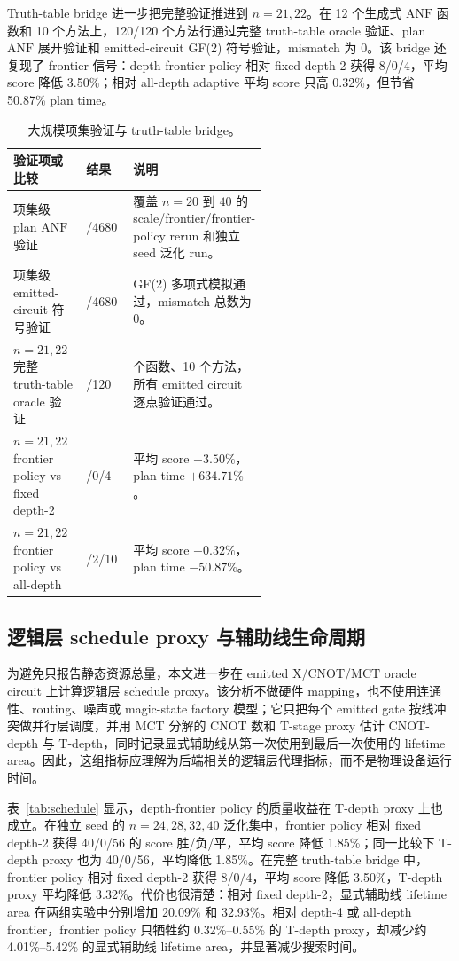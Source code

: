 \documentclass[UTF8,fontset=macnew,11pt]{ctexart}
\newcommand{\anf}{\ensuremath{\mathrm{ANF}}}
\newcommand{\ttable}{truth-table}
\newcommand{\mct}{\ensuremath{\mathrm{MCT}}}
\begin{document}
Truth-table bridge 进一步把完整验证推进到 $n=21,22$。在 12 个生成式 \anf{} 函数和 10 个方法上，120/120 个方法行通过完整 \ttable{} oracle 验证、plan \anf{} 展开验证和 emitted-circuit GF(2) 符号验证，mismatch 为 0。该 bridge 还复现了 frontier 信号：depth-frontier policy 相对 fixed depth-2 获得 8/0/4，平均 score 降低 3.50\%；相对 all-depth adaptive 平均 score 只高 0.32\%，但节省 50.87\% plan time。

\begin{table}[H]
\centering
\scriptsize
\caption{大规模项集验证与 truth-table bridge。}
\label{tab:verification}
\begin{tabularx}{\linewidth}{>{\raggedright\arraybackslash}p{0.35\linewidth}>{\raggedright\arraybackslash}p{0.22\linewidth}>{\raggedright\arraybackslash}X}
\toprule
验证项或比较 & 结果 & 说明 \\
\midrule
项集级 plan \anf{} 验证 & 4680/4680 & 覆盖 $n=20$ 到 $40$ 的 scale/frontier/frontier-policy rerun 和独立 seed 泛化 run。 \\
项集级 emitted-circuit 符号验证 & 4680/4680 & GF(2) 多项式模拟通过，mismatch 总数为 0。 \\
$n=21,22$ 完整 \ttable{} oracle 验证 & 120/120 & 12 个函数、10 个方法，所有 emitted circuit 逐点验证通过。 \\
$n=21,22$ frontier policy vs fixed depth-2 & 8/0/4 & 平均 score $-3.50\%$，plan time $+634.71\%$。 \\
$n=21,22$ frontier policy vs all-depth & 0/2/10 & 平均 score $+0.32\%$，plan time $-50.87\%$。 \\
\bottomrule
\end{tabularx}
\end{table}

\subsection{逻辑层 schedule proxy 与辅助线生命周期}

为避免只报告静态资源总量，本文进一步在 emitted X/CNOT/\mct{} oracle circuit 上计算逻辑层 schedule proxy。该分析不做硬件 mapping，也不使用连通性、routing、噪声或 magic-state factory 模型；它只把每个 emitted gate 按线冲突做并行层调度，并用 MCT 分解的 CNOT 数和 T-stage proxy 估计 CNOT-depth 与 T-depth，同时记录显式辅助线从第一次使用到最后一次使用的 lifetime area。因此，这组指标应理解为后端相关的逻辑层代理指标，而不是物理设备运行时间。

表~\ref{tab:schedule} 显示，depth-frontier policy 的质量收益在 T-depth proxy 上也成立。在独立 seed 的 $n=24,28,32,40$ 泛化集中，frontier policy 相对 fixed depth-2 获得 40/0/56 的 score 胜/负/平，平均 score 降低 1.85\%；同一比较下 T-depth proxy 也为 40/0/56，平均降低 1.85\%。在完整 \ttable{} bridge 中，frontier policy 相对 fixed depth-2 获得 8/0/4，平均 score 降低 3.50\%，T-depth proxy 平均降低 3.32\%。代价也很清楚：相对 fixed depth-2，显式辅助线 lifetime area 在两组实验中分别增加 20.09\% 和 32.93\%。相对 depth-4 或 all-depth frontier，frontier policy 只牺牲约 0.32\%--0.55\% 的 T-depth proxy，却减少约 4.01\%--5.42\% 的显式辅助线 lifetime area，并显著减少搜索时间。
\end{document}

